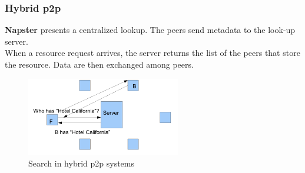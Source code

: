 \documentclass[paper=a4, fontsize=11pt]{scrartcl} %
\numberwithin{equation}{section} %
\numberwithin{figure}{section} %
\numberwithin{table}{section} %
\begin{document}
\subsubsection*{Hybrid p2p}
\textbf{Napster} presents a centralized lookup. The peers send metadata to the look-up server.\\
When a resource request arrives, the server returns the list of the peers that store the resource. Data are then exchanged among peers.
 \begin{figure}[H]
  \centering
  \includegraphics[width=0.6\textwidth]{img/search_n.png}
  \caption{Search in hybrid p2p systems}
  \label{fig:boat1}
\end{figure}
\end{document}
